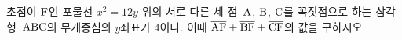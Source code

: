 초점이 $\mathrm{F}$인 포물선 $x^2=12y$ 위의 서로 다른 세 점~$\mathrm{A}$, $\mathrm{B}$, $\mathrm{C}$를 꼭짓점으로 하는 삼각형~$\mathrm{ABC}$의 무게중심의 $y$좌표가 $4$이다. 이때 $\overline{\mathrm{AF}}+\overline{\mathrm{BF}}+\overline{\mathrm{CF}}$의 값을 구하시오.
